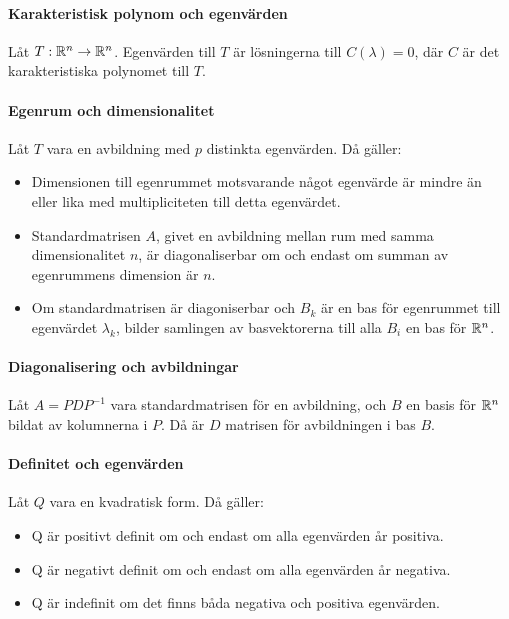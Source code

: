 \proof

\paragraph{Karakteristisk polynom och egenvärden}
Låt $T:\mathbb{R}^n\to\mathbb{R}^n$. Egenvärden till $T$ är lösningerna till $C(\lambda) = 0$, där $C$ är det karakteristiska polynomet till $T$.

\proof

\paragraph{Egenrum och dimensionalitet}
Låt $T$ vara en avbildning med $p$ distinkta egenvärden. Då gäller:
\begin{itemize}
	\item Dimensionen till egenrummet motsvarande något egenvärde är mindre än eller lika med multipliciteten till detta egenvärdet.
	\item Standardmatrisen $A$, givet en avbildning mellan rum med samma dimensionalitet $n$, är diagonaliserbar om och endast om summan av egenrummens dimension är $n$.
	\item Om standardmatrisen är diagoniserbar och $B_k$ är en bas för egenrummet till egenvärdet $\lambda_k$, bilder samlingen av basvektorerna till alla $B_i$ en bas för $\mathbb{R}^n$.
\end{itemize}

\proof

\paragraph{Diagonalisering och avbildningar}
Låt $A = PDP^{-1}$ vara standardmatrisen för en avbildning, och $B$ en basis för $\mathbb{R}^n$ bildat av kolumnerna i $P$. Då är $D$ matrisen för avbildningen i bas $B$.

\proof

\paragraph{Definitet och egenvärden}
Låt $Q$ vara en kvadratisk form. Då gäller:
\begin{itemize}
	\item Q är positivt definit om och endast om alla egenvärden år positiva.
	\item Q är negativt definit om och endast om alla egenvärden år negativa.
	\item Q är indefinit om det finns båda negativa och positiva egenvärden.
\end{itemize}